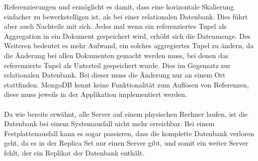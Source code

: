  Referenzierungen und ermöglicht es damit, dass eine horizontale Skalierung
 einfacher zu bewerkstelligen ist, als bei einer relationalen Datenbank. Dies
 führt aber auch Nachteile mit sich. Jedes mal wenn ein referenziertes
 Tupel als Aggregation in ein Dokument gespeichert wird, erhöht sich die
 Datenmenge. Des Weiteren bedeutet es mehr Aufwand, ein solches aggregiertes
 Tupel zu ändern, da die Änderung bei allen Dokumenten gemacht werden muss, bei denen
 das referenzierte Tupel als Unterteil gespeichert wurde. Dies im Gegensatz zur
 relationalen Datenbank. Bei dieser muss die Änderung nur an einem Ort
 stattfinden. MongoDB kennt keine Funktionalität zum Auflösen von Referenzen, diese muss jeweils in der Applikation implementiert werden. \\\\
 Da wie bereits erwähnt, alle Server auf einem physischen Rechner
 laufen, ist die Datenbank bei einem Systemausfall nicht mehr erreichbar.
 Bei einem Festplattenausfall kann es sogar passieren, dass die komplette
 Datenbank verloren geht, da es in der Replica Set nur einen Server gibt, und
 somit ein weiter Server fehlt, der ein Replikat der Datenbank enthält.
 